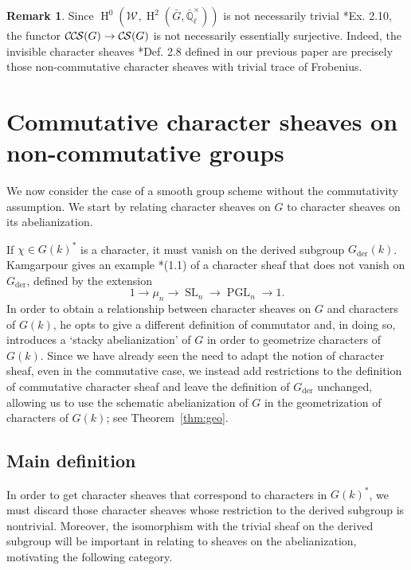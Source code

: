 \documentclass[10pt]{amsart}
\theoremstyle{plain}
\theoremstyle{definition}
\newtheorem{remark}[theorem]{Remark}
\newcommand{\EE}{\mathbb{\bar Q}_\ell}
\newcommand{\Fq}{k}
\newcommand{\EEx}{\EE^\times}
\newcommand{\Weil}[1]{\mathcal{W}_{#1}}
\DeclareMathOperator{\Hh}{H}
\DeclareMathOperator{\SL}{SL}
\DeclareMathOperator{\PGL}{PGL}
\newcommand{\der}{_{\operatorname{der}}}
\newcommand{\CS}{{\mathcal{C\hskip-0.8pt S}}}
\newcommand{\CCS}{{\mathcal{C\hskip-.8pt C\hskip-0.8pt S}}}
\newcommand{\bG}{\bar{G}}
\begin{document}
\begin{remark}
Since $\Hh^0(\Weil{},\Hh^2(\bG,\EEx))$ is not necessarily trivial \cite{cunningham-roe:13a}*{Ex. 2.10}, the functor
$\CCS(G) \to \CS(G)$ is not necessarily essentially surjective.  Indeed, the invisible character sheaves \cite{cunningham-roe:13a}*{Def. 2.8}
defined in our previous paper are precisely those non-commutative character sheaves with trivial trace of Frobenius.
\end{remark}

\section{Commutative character sheaves on non-commutative groups}\label{sec:noncom}

We now consider the case of a smooth group scheme without the commutativity assumption.  We start
by relating character sheaves on $G$ to character sheaves on its abelianization.

If $\chi \in G(k)^*$ is a character, it must vanish on the derived subgroup $G\der(k)$.
Kamgarpour gives an example \cite{kamgarpour:09a}*{(1.1)} of a character sheaf
that does not vanish on $G\der$, defined by the extension
\[
1 \to \mu_n \to \SL_n \to \PGL_n \to 1.
\]
In order to obtain a relationship between character sheaves on $G$ and characters of $G(k)$,
he opts to give a different definition of commutator and, in doing so, introduces a `stacky abelianization' of $G$ in order to geometrize characters of $G(\Fq)$.
 Since we have already seen the need to adapt the
notion of character sheaf, even in the commutative case, we instead add restrictions
to the definition of commutative character sheaf and leave the definition of $G\der$ unchanged, allowing us to use the schematic abelianization of $G$ in the geometrization of characters of $G(\Fq)$; see Theorem~\ref{thm:geo}.

\subsection{Main definition}\label{ssec:noncomdef}

In order to get character sheaves that correspond to characters in $G(k)^*$, we must discard those
character sheaves whose restriction to the derived subgroup is nontrivial.  Moreover, the isomorphism
with the trivial sheaf on the derived subgroup will be important in relating to sheaves on the abelianization,
motivating the following category.
\end{document}

